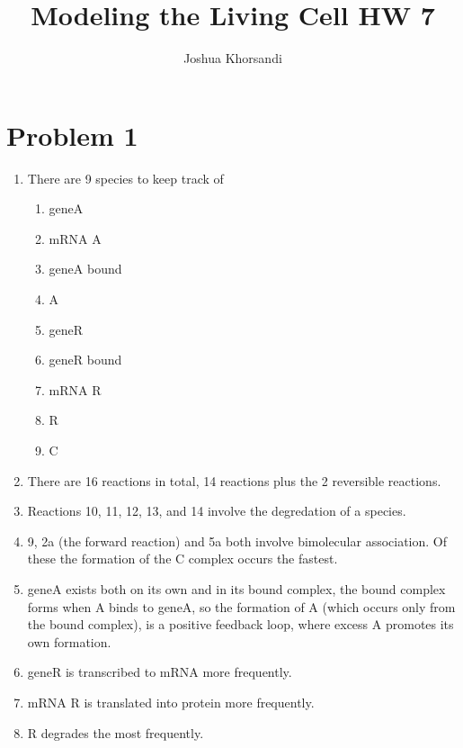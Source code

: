 \documentclass{article}
\title{Modeling the Living Cell HW 7}
\author{Joshua Khorsandi}
\begin{document}
\maketitle

\section*{Problem 1}
\begin{enumerate}
    \item There are 9 species to keep track of 
    \begin{enumerate}
        \item geneA
        \item mRNA A 
        \item geneA bound
        \item A 
        \item geneR
        \item geneR bound
        \item mRNA R 
        \item R 
        \item C
    \end{enumerate}
    \item There are 16 reactions in total, 14 reactions plus the 2 reversible reactions.
    \item Reactions 10, 11, 12, 13, and 14 involve the degredation of a species.
    \item 9, 2a (the forward reaction) and 5a both involve bimolecular association. Of these the formation of the C complex occurs the fastest.
    \item geneA exists both on its own and in its bound complex, the bound complex forms when A binds to geneA, so the formation of A (which occurs only from the bound complex), is a positive feedback loop, where excess A promotes its own formation.
    \item geneR is transcribed to mRNA more frequently. 
    \item mRNA R is translated into protein more frequently.
    \item R degrades the most frequently.
\end{enumerate}
\end{document}
